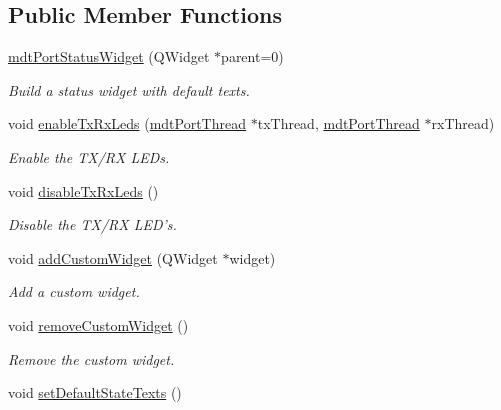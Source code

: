 \subsection*{Public Member Functions}
\begin{DoxyCompactItemize}
\item 
\hypertarget{classmdt_port_status_widget_ac92d61928204f88704de3f597d5754c7}{
\hyperlink{classmdt_port_status_widget_ac92d61928204f88704de3f597d5754c7}{mdtPortStatusWidget} (QWidget $\ast$parent=0)}
\label{classmdt_port_status_widget_ac92d61928204f88704de3f597d5754c7}

\begin{DoxyCompactList}\small\item\em Build a status widget with default texts. \end{DoxyCompactList}\item 
void \hyperlink{classmdt_port_status_widget_a8e87596be48b5cfda6703c42655b2f25}{enableTxRxLeds} (\hyperlink{classmdt_port_thread}{mdtPortThread} $\ast$txThread, \hyperlink{classmdt_port_thread}{mdtPortThread} $\ast$rxThread)
\begin{DoxyCompactList}\small\item\em Enable the TX/RX LEDs. \end{DoxyCompactList}\item 
\hypertarget{classmdt_port_status_widget_af57ccc9a560d8ae1a49bc57a774a7db7}{
void \hyperlink{classmdt_port_status_widget_af57ccc9a560d8ae1a49bc57a774a7db7}{disableTxRxLeds} ()}
\label{classmdt_port_status_widget_af57ccc9a560d8ae1a49bc57a774a7db7}

\begin{DoxyCompactList}\small\item\em Disable the TX/RX LED's. \end{DoxyCompactList}\item 
void \hyperlink{classmdt_port_status_widget_ac14c1207abd242248538815542cb9068}{addCustomWidget} (QWidget $\ast$widget)
\begin{DoxyCompactList}\small\item\em Add a custom widget. \end{DoxyCompactList}\item 
void \hyperlink{classmdt_port_status_widget_a108227f8f64dd69edd2dcdca2b52b8a0}{removeCustomWidget} ()
\begin{DoxyCompactList}\small\item\em Remove the custom widget. \end{DoxyCompactList}\item 
\hypertarget{classmdt_port_status_widget_afa0b9020b56e33ea2a6c680552447228}{
void \hyperlink{classmdt_port_status_widget_afa0b9020b56e33ea2a6c680552447228}{setDefaultStateTexts} ()}
\label{classmdt_port_status_widget_afa0b9020b56e33ea2a6c680552447228}


\end{DoxyCompactItemize}
